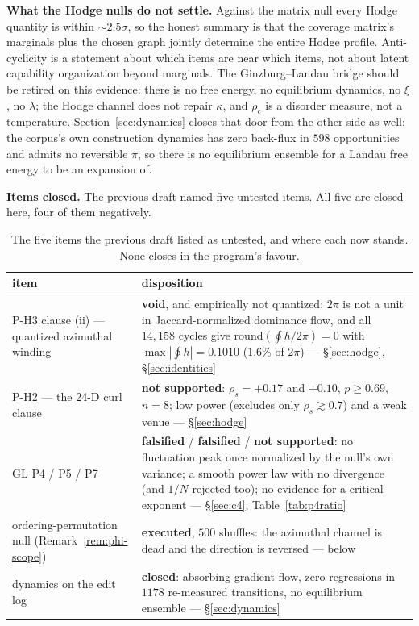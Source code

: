 \documentclass[11pt,a4paper]{article}
\theoremstyle{plain}
\theoremstyle{remark}
\theoremstyle{plain}
\begin{document}
\textbf{What the Hodge nulls do not settle.} Against the matrix null every Hodge quantity is within $\sim\!2.5\sigma$, so the honest summary is that the coverage matrix's marginals plus the chosen graph jointly determine the entire Hodge profile. Anti-cyclicity is a statement about which items are near which items, not about latent capability organization beyond marginals. The Ginzburg--Landau bridge should be retired on this evidence: there is no free energy, no equilibrium dynamics, no $\xi$, no $\lambda$; the Hodge channel does not repair $\kappa$, and $\rho_{\mathrm c}$ is a disorder measure, not a temperature. Section~\ref{sec:dynamics} closes that door from the other side as well: the corpus's own construction dynamics has zero back-flux in $598$ opportunities and admits no reversible $\pi$, so there is no equilibrium ensemble for a Landau free energy to be an expansion of.

\textbf{Items closed.} The previous draft named five untested items. All five are closed here, four of them negatively.

\begin{table}[h]\centering\small
\begin{tabular}{lp{8.3cm}}
\toprule
item & disposition \\
\midrule
P-H3 clause (ii) --- quantized azimuthal winding & \textbf{void}, and empirically not quantized: $2\pi$ is not a unit in Jaccard-normalized dominance flow, and all $14{,}158$ cycles give $\mathrm{round}(\oint h/2\pi)=0$ with $\max|\oint h|=0.1010$ ($1.6\%$ of $2\pi$) --- \S\ref{sec:hodge}, \S\ref{sec:identities} \\
P-H2 --- the 24-D curl clause & \textbf{not supported}: $\rho_s=+0.17$ and $+0.10$, $p\ge0.69$, $n=8$; low power (excludes only $\rho_s\gtrsim0.7$) and a weak venue --- \S\ref{sec:hodge} \\
GL P4 / P5 / P7 & \textbf{falsified} / \textbf{falsified} / \textbf{not supported}: no fluctuation peak once normalized by the null's own variance; a smooth power law with no divergence (and $1/N$ rejected too); no evidence for a critical exponent --- \S\ref{sec:c4}, Table~\ref{tab:p4ratio} \\
ordering-permutation null (Remark~\ref{rem:phi-scope}) & \textbf{executed}, $500$ shuffles: the azimuthal channel is dead and the direction is reversed --- below \\
dynamics on the edit log & \textbf{closed}: absorbing gradient flow, zero regressions in $1178$ re-measured transitions, no equilibrium ensemble --- \S\ref{sec:dynamics} \\
\bottomrule
\end{tabular}
\caption{The five items the previous draft listed as untested, and where each now
stands. None closes in the program's favour.}
\label{tab:itemsclosed}
\end{table}
\end{document}
